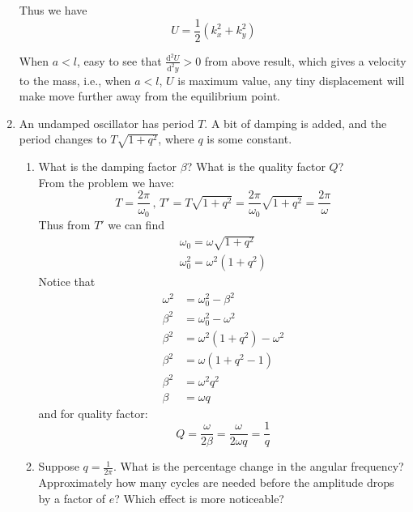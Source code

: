 \documentclass{article}
\newcommand{\de}{\mathrm{d}}
\begin{document}
\begin{enumerate}
    Thus we have 
    \[
    U = \frac{1}{2}(k_x^2+k_y^2)
    \]

    When $a < l$, easy to see that $\frac{\de^2 U}{\de^2 y}>0$ from above result, which gives a velocity to the mass, i.e., when $a < l$, $U$ is maximum value, any tiny displacement will make move further away from the equilibrium point.




    \item An undamped oscillator has period $T$. A bit of damping is added, and the period changes to $T\sqrt{1+q^2}$, where $q$ is some constant.
    \begin{enumerate}
        \item What is the damping factor $\beta$? What is the quality factor $Q$? \\

        From the problem we have:
        \[
        T = \frac{2\pi}{\omega_0} \, , \, T' = T\sqrt{1+q^2} = \frac{2\pi}{\omega_0}\sqrt{1+q^2} = \frac{2\pi}{\omega}
        \]
        Thus from $T'$ we can find
        \begin{align*}
            \omega_0 = \omega\sqrt{1+q^2} \\
            \omega_0^2 = \omega^2(1+q^2)
        \end{align*}
        Notice that
        \begin{align*}
            \omega^2 &= \omega_0^2 - \beta^2 \\
            \beta^2 &= \omega_0^2 - \omega^2 \\
            \beta^2 &= \omega^2(1+q^2) - \omega^2 \\
            \beta^2 &= \omega(1+q^2-1)\\
            \beta^2 &= \omega^2 q^2\\
            \beta &= \omega q
        \end{align*}
        and for quality factor:
        \[
        Q = \frac{\omega}{2\beta} = \frac{\omega}{2\omega q} = \frac{1}{q}
        \]
        \item Suppose $q = \frac{1}{2\pi}$. What is the percentage change in the angular frequency? Approximately how many cycles are needed before the amplitude drops by a factor of $e$? Which effect is more noticeable?\\


\end{enumerate}
\end{enumerate}
\end{document}
